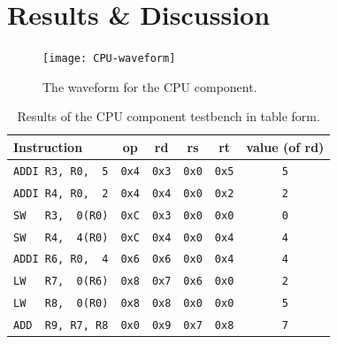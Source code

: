 \documentclass[11pt]{report}
\begin{document}
\section*{Results \& Discussion}
\begin{figure}[h!]
    \centering
    \texttt{[image: CPU-waveform]}
    \caption{The waveform for the CPU component.}
    \label{fig:CPU-waveform}
\end{figure}

\begin{table}[ht!]
    \centering
    \begin{tabular}{|l||c|c|c|c|c|} 
     \hline
     Instruction & op & rd & rs & rt & value (of rd) \\
     \hline
     \verb|ADDI R3, R0,  5| & \verb|0x4| & \verb|0x3| & \verb|0x0| & \verb|0x5| & \verb|5| \\ 
     \hline                                                                             
     \verb|ADDI R4, R0,  2| & \verb|0x4| & \verb|0x4| & \verb|0x0| & \verb|0x2| & \verb|2| \\
     \hline                                                                             
     \verb|SW   R3,  0(R0)| & \verb|0xC| & \verb|0x3| & \verb|0x0| & \verb|0x0| & \verb|0| \\
     \hline                                                                             
     \verb|SW   R4,  4(R0)| & \verb|0xC| & \verb|0x4| & \verb|0x0| & \verb|0x4| & \verb|4| \\ 
     \hline                                                                             
     \verb|ADDI R6, R0,  4| & \verb|0x6| & \verb|0x6| & \verb|0x0| & \verb|0x4| & \verb|4| \\
     \hline                                                                             
     \verb|LW   R7,  0(R6)| & \verb|0x8| & \verb|0x7| & \verb|0x6| & \verb|0x0| & \verb|2| \\
     \hline                                                                             
     \verb|LW   R8,  0(R0)| & \verb|0x8| & \verb|0x8| & \verb|0x0| & \verb|0x0| & \verb|5| \\
     \hline
     \verb|ADD  R9, R7, R8| & \verb|0x0| & \verb|0x9| & \verb|0x7| & \verb|0x8| & \verb|7| \\
     \hline                                                                             
    \end{tabular}
    \caption{Results of the CPU component testbench in table form.}
    \label{table:CPU-waveform_table}
\end{table}
\end{document}
